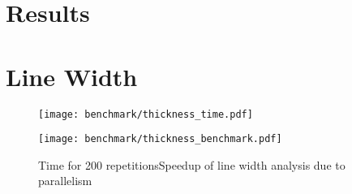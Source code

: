 \documentclass[../main.tex]{subfiles}
\begin{document}
  \section{Results}
  \section{Line Width}
      \begin{figure}[h]
      \centering
      \texttt{[image: benchmark/thickness\_time.pdf]}

      \texttt{[image: benchmark/thickness\_benchmark.pdf]}

      \caption[
        Time and Speedup of parallel line width analysis
      ]{Time for 200 repetitionsSpeedup of line width analysis due to parallelism}
      \label{thicknessbenchmark}
    \end{figure}
    \biblio
\end{document}

